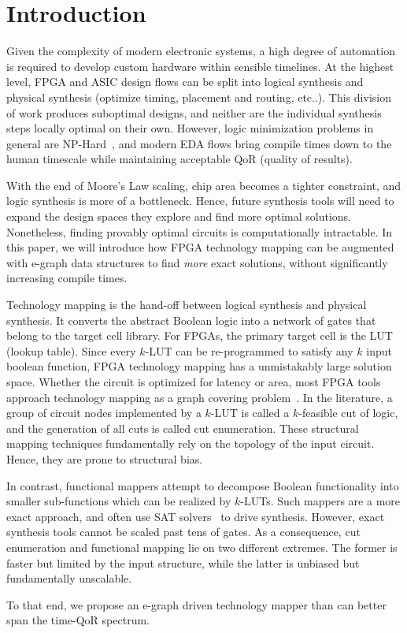 \section{Introduction}\label{sec:intro}
Given the complexity of modern electronic systems, a high degree of automation
is required to develop custom hardware within sensible timelines. At the
highest level, FPGA and ASIC design flows can be split into logical synthesis
and physical synthesis (optimize timing, placement and routing, etc..). This
division of work produces suboptimal designs, and neither are the individual
synthesis steps locally optimal on their own. However, logic minimization
problems in general are NP-Hard~\cite{logicmin,twolevellogic}, and modern EDA
flows bring compile times down to the human timescale while maintaining
acceptable QoR (quality of results).

With the end of Moore's Law scaling, chip area becomes a tighter constraint,
and logic synthesis is more of a bottleneck. Hence, future synthesis tools will
need to expand the design spaces they explore and find more optimal solutions.
Nonetheless, finding provably optimal circuits is computationally intractable.
In this paper, we will introduce how FPGA technology mapping can be augmented
with e-graph data structures to find \textit{more} exact solutions, without
significantly increasing compile times.

Technology mapping is the hand-off between logical synthesis and physical
synthesis. It converts the abstract Boolean logic into a network of gates that
belong to the target cell library. For FPGAs, the primary target cell is the
LUT (lookup table). Since every $k$-LUT can be re-programmed to satisfy any $k$
input boolean function, FPGA technology mapping has a unmistakably large
solution space. Whether the circuit is optimized for latency or area, most FPGA
tools approach technology mapping as a graph covering problem~\cite{flowmap,
    daomap, attmap, imap}. In the literature, a group of circuit nodes implemented
by a $k$-LUT is called a $k$-feasible cut of logic, and the generation of all
cuts is called cut enumeration. These structural mapping techniques
fundamentally rely on the topology of the input circuit. Hence, they are prone
to structural bias.

In contrast, functional mappers attempt to decompose Boolean functionality into
smaller sub-functions which can be realized by $k$-LUTs. Such mappers are a
more exact approach, and often use SAT solvers~\cite{satmap,satmap2} to drive
synthesis. However, exact synthesis tools cannot be scaled past tens of gates.
As a consequence, cut enumeration and functional mapping lie on two different
extremes. The former is faster but limited by the input structure, while the
latter is unbiased but fundamentally unscalable.

To that end, we propose an e-graph driven technology mapper than can better
span the time-QoR spectrum.

